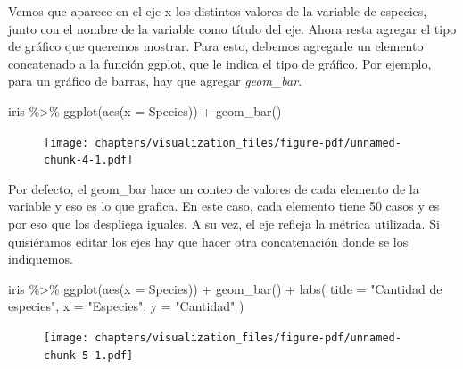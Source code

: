 \documentclass[
  letterpaper,
  DIV=11,
  numbers=noendperiod]{scrreprt}
\newenvironment{Shaded}{\begin{snugshade}}{\end{snugshade}}
\newcommand{\AttributeTok}[1]{\textcolor[rgb]{0.40,0.45,0.13}{#1}}
\newcommand{\FunctionTok}[1]{\textcolor[rgb]{0.28,0.35,0.67}{#1}}
\newcommand{\NormalTok}[1]{\textcolor[rgb]{0.00,0.23,0.31}{#1}}
\newcommand{\SpecialCharTok}[1]{\textcolor[rgb]{0.37,0.37,0.37}{#1}}
\newcommand{\StringTok}[1]{\textcolor[rgb]{0.13,0.47,0.30}{#1}}
\begin{document}
Vemos que aparece en el eje x los distintos valores de la variable de
especies, junto con el nombre de la variable como título del eje. Ahora
resta agregar el tipo de gráfico que queremos mostrar. Para esto,
debemos agregarle un elemento concatenado a la función ggplot, que le
indica el tipo de gráfico. Por ejemplo, para un gráfico de barras, hay
que agregar \emph{geom\_bar}.

\begin{Shaded}
\begin{Highlighting}[]
\NormalTok{iris }\SpecialCharTok{\%\textgreater{}\%} 
  \FunctionTok{ggplot}\NormalTok{(}\FunctionTok{aes}\NormalTok{(}\AttributeTok{x =}\NormalTok{ Species)) }\SpecialCharTok{+}
  \FunctionTok{geom\_bar}\NormalTok{()}
\end{Highlighting}
\end{Shaded}

\begin{figure}[H]

{\centering \texttt{[image: chapters/visualization\_files/figure-pdf/unnamed-chunk-4-1.pdf]}

}

\end{figure}

Por defecto, el geom\_bar hace un conteo de valores de cada elemento de
la variable y eso es lo que grafica. En este caso, cada elemento tiene
50 casos y es por eso que los despliega iguales. A su vez, el eje
refleja la métrica utilizada. Si quisiéramos editar los ejes hay que
hacer otra concatenación donde se los indiquemos.

\begin{Shaded}
\begin{Highlighting}[]
\NormalTok{iris }\SpecialCharTok{\%\textgreater{}\%} 
  \FunctionTok{ggplot}\NormalTok{(}\FunctionTok{aes}\NormalTok{(}\AttributeTok{x =}\NormalTok{ Species)) }\SpecialCharTok{+}
  \FunctionTok{geom\_bar}\NormalTok{() }\SpecialCharTok{+}
  \FunctionTok{labs}\NormalTok{(}
    \AttributeTok{title =} \StringTok{"Cantidad de especies"}\NormalTok{,}
    \AttributeTok{x =} \StringTok{"Especies"}\NormalTok{,}
    \AttributeTok{y =} \StringTok{"Cantidad"}
\NormalTok{  )}
\end{Highlighting}
\end{Shaded}

\begin{figure}[H]

{\centering \texttt{[image: chapters/visualization\_files/figure-pdf/unnamed-chunk-5-1.pdf]}

}

\end{figure}
\end{document}
